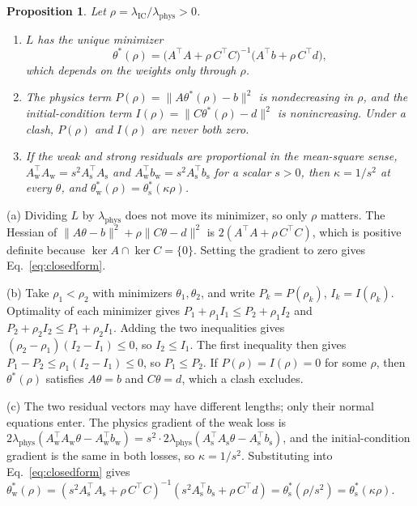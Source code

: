 \documentclass[a4paper,fleqn]{cas-sc}
\newtheorem{proposition}{Proposition}
\begin{document}
\begin{proposition}
\label{prop:linear}
Let $\rho=\lambda_{\mathrm{IC}}/\lambda_{\mathrm{phys}}>0$.
\begin{enumerate}
\item[(a)] $L$ has the unique minimizer
\begin{equation}
\theta^*(\rho) = \bigl(A^{\top}A+\rho\,C^{\top}C\bigr)^{-1}\bigl(A^{\top}b+\rho\,C^{\top}d\bigr),
\label{eq:closedform}
\end{equation}
which depends on the weights only through $\rho$.
\item[(b)] The physics term $P(\rho)=\|A\theta^*(\rho)-b\|^2$ is nondecreasing in $\rho$, and the initial-condition term
$I(\rho)=\|C\theta^*(\rho)-d\|^2$ is nonincreasing. Under a clash, $P(\rho)$ and $I(\rho)$ are never both zero.
\item[(c)] If the weak and strong residuals are proportional in the mean-square sense,
$A_{\mathrm{w}}^{\top}A_{\mathrm{w}}=s^2A_{\mathrm{s}}^{\top}A_{\mathrm{s}}$ and
$A_{\mathrm{w}}^{\top}b_{\mathrm{w}}=s^2A_{\mathrm{s}}^{\top}b_{\mathrm{s}}$ for a scalar $s>0$, then $\kappa=1/s^2$ at every $\theta$, and
$\theta^*_{\mathrm{w}}(\rho)=\theta^*_{\mathrm{s}}(\kappa\rho)$.
\end{enumerate}
\end{proposition}

\begin{pf}
(a) Dividing $L$ by $\lambda_{\mathrm{phys}}$ does not move its minimizer, so only $\rho$ matters. The Hessian of
$\|A\theta-b\|^2+\rho\|C\theta-d\|^2$ is $2(A^{\top}A+\rho\,C^{\top}C)$, which is positive definite because
$\ker A\cap\ker C=\{0\}$. Setting the gradient to zero gives Eq.~\eqref{eq:closedform}.

(b) Take $\rho_1<\rho_2$ with minimizers $\theta_1,\theta_2$, and write $P_k=P(\rho_k)$, $I_k=I(\rho_k)$. Optimality of
each minimizer gives $P_1+\rho_1I_1\le P_2+\rho_1I_2$ and $P_2+\rho_2I_2\le P_1+\rho_2I_1$. Adding the two
inequalities gives $(\rho_2-\rho_1)(I_2-I_1)\le0$, so $I_2\le I_1$. The first inequality then gives
$P_1-P_2\le\rho_1(I_2-I_1)\le0$, so $P_1\le P_2$. If $P(\rho)=I(\rho)=0$ for some $\rho$, then $\theta^*(\rho)$
satisfies $A\theta=b$ and $C\theta=d$, which a clash excludes.

(c) The two residual vectors may have different lengths; only their normal equations enter. The physics gradient of
the weak loss is $2\lambda_{\mathrm{phys}}(A_{\mathrm{w}}^{\top}A_{\mathrm{w}}\theta-A_{\mathrm{w}}^{\top}b_{\mathrm{w}})
=s^2\cdot2\lambda_{\mathrm{phys}}(A_{\mathrm{s}}^{\top}A_{\mathrm{s}}\theta-A_{\mathrm{s}}^{\top}b_{\mathrm{s}})$, and the
initial-condition gradient is the same in both losses, so $\kappa=1/s^2$. Substituting into Eq.~\eqref{eq:closedform}
gives $\theta^*_{\mathrm{w}}(\rho)=(s^2A_{\mathrm{s}}^{\top}A_{\mathrm{s}}+\rho\,C^{\top}C)^{-1}
(s^2A_{\mathrm{s}}^{\top}b_{\mathrm{s}}+\rho\,C^{\top}d)=\theta^*_{\mathrm{s}}(\rho/s^2)=\theta^*_{\mathrm{s}}(\kappa\rho)$.
\end{pf}
\end{document}

